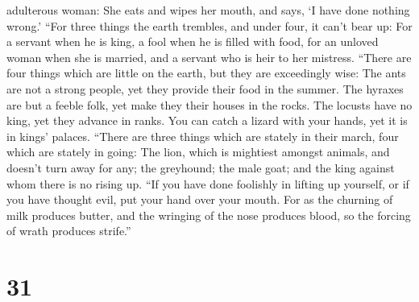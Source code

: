 adulterous woman: She eats and wipes her mouth, and says, `I have done
nothing wrong.'  ``For three things the earth trembles, and
under four, it can't bear up:  For a servant when he is
king, a fool when he is filled with food,  for an unloved
woman when she is married, and a servant who is heir to her mistress.
 ``There are four things which are little on the earth, but
they are exceedingly wise:  The ants are not a strong
people, yet they provide their food in the summer.  The
hyraxes are but a feeble folk, yet make they their houses in the rocks.
 The locusts have no king, yet they advance in ranks.
 You can catch a lizard with your hands, yet it is in
kings' palaces.  ``There are three things which are stately
in their march, four which are stately in going:  The lion,
which is mightiest amongst animals, and doesn't turn away for any;
 the greyhound; the male goat; and the king against whom
there is no rising up.  ``If you have done foolishly in
lifting up yourself, or if you have thought evil, put your hand over
your mouth.  For as the churning of milk produces butter,
and the wringing of the nose produces blood, so the forcing of wrath
produces strife.''

\hypertarget{section-26}{%
\section{31}\label{section-26}}

